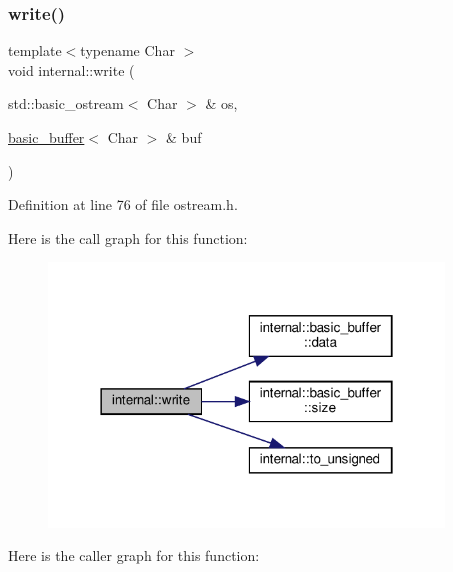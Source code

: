 \subsubsection{\texorpdfstring{write()}{write()}}
{\footnotesize\ttfamily template$<$typename Char $>$ \\
void internal\+::write (\begin{DoxyParamCaption}\item[{std\+::basic\+\_\+ostream$<$ Char $>$ \&}]{os,  }\item[{\hyperlink{classinternal_1_1basic__buffer}{basic\+\_\+buffer}$<$ Char $>$ \&}]{buf }\end{DoxyParamCaption})}



Definition at line 76 of file ostream.\+h.

Here is the call graph for this function\+:
\nopagebreak
\begin{figure}[H]
\begin{center}
\leavevmode
\includegraphics[width=298pt]{namespaceinternal_a1d6eb1d297ebb5fc0f724732f23b22eb_cgraph}
\end{center}
\end{figure}
Here is the caller graph for this function\+:
\nopagebreak

